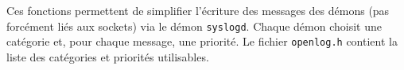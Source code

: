 \documentclass [twoside] {report}
\begin{document}
Ces fonctions permettent de simplifier l'écriture des messages des
démons (pas forcément liés aux sockets) via le démon \texttt {syslogd}.
Chaque démon choisit une catégorie et, pour chaque message, une
priorité. Le fichier \texttt {openlog.h} contient la liste des catégories et
priorités utilisables.

% 
% 
% 
\end{document}

